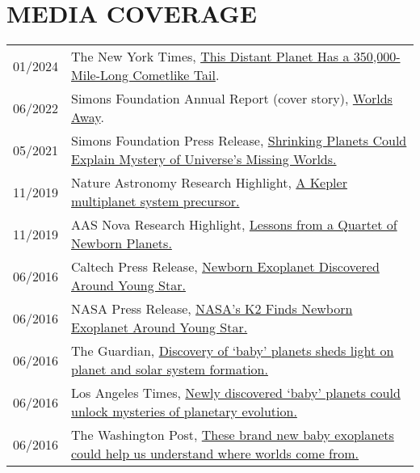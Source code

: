 \section{\large MEDIA COVERAGE}
\begin{tabular}{ll}
01/2024 & The New York Times, \href{https://www.nytimes.com/2024/01/12/science/wasp-69b-tail-planet.html}{This Distant Planet Has a 350,000-Mile-Long Cometlike Tail}.\\ 
06/2022 & Simons Foundation Annual Report (cover story), \href{https://annualreports.simonsfoundation.org/2021/worlds-away/}{Worlds Away}.\\
05/2021 & Simons Foundation Press Release, \href{https://www.simonsfoundation.org/2021/05/14/shrinking-planets-could-explain-mystery-of-universes-missing-worlds/}{Shrinking Planets Could Explain Mystery of Universe’s Missing Worlds.}\\
11/2019 & Nature Astronomy Research Highlight, \href{https://www.nature.com/articles/s41550-019-0981-y}{A Kepler multiplanet system precursor.}\\
11/2019 & AAS Nova Research Highlight, \href{https://aasnova.org/2019/11/06/lessons-from-a-quartet-of-newborn-planets/}{Lessons from a Quartet of Newborn Planets.}\\
06/2016 & Caltech Press Release, \href{https://www.caltech.edu/about/news/newborn-exoplanet-discovered-around-young-star-51017}{Newborn Exoplanet Discovered Around Young Star.}\\
06/2016 & NASA Press Release, \href{https://www.nasa.gov/feature/jpl/nasas-k2-finds-newborn-exoplanet-around-young-star}{NASA's K2 Finds Newborn Exoplanet Around Young Star.}\\
06/2016 & The Guardian, \href{https://www.theguardian.com/science/2016/jun/20/baby-planets-givel-first-insights-into-planet-and-solar-system-formation-k233b}{Discovery of `baby' planets sheds light on planet and solar system formation.} \\
06/2016 & Los Angeles Times, \href{https://www.latimes.com/science/sciencenow/la-sci-sn-young-exoplanet-20160620-snap-story.html}{Newly discovered `baby' planets could unlock mysteries of planetary evolution.} \\
06/2016 & The Washington Post, \href{https://www.washingtonpost.com/news/speaking-of-science/wp/2016/06/20/these-brand-new-baby-exoplanets-could-help-us-understand-where-worlds-come-from/}{These brand new baby exoplanets could help us understand where worlds come from.}
\end{tabular}
